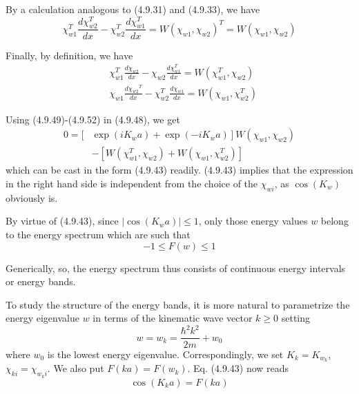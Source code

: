 \documentclass{article}
\begin{document}
By a calculation analogous to (4.9.31) and (4.9.33), we have
$$
\begin{equation*}
\chi_{w 1}^{T} \frac{d \chi_{w 2}^{T}}{d x}-\chi_{w 2}^{T} \frac{d \chi_{w 1}^{T}}{d x}=W\left(\chi_{w 1}, \chi_{w 2}\right)^{T}=W\left(\chi_{w 1}, \chi_{w 2}\right) \tag{4.9.50}
\end{equation*}
$$

Finally, by definition, we have
$$
\begin{align*}
& \chi_{w 1}^{T} \frac{d \chi_{w 2}}{d x}-\chi_{w 2} \frac{d \chi_{w 1}^{T}}{d x}=W\left(\chi_{w 1}^{T}, \chi_{w 2}\right)  \tag{4.9.51}\\
& \chi_{w 1} \frac{d \chi_{w 2}{ }^{T}}{d x}-\chi_{w 2}^{T} \frac{d \chi_{w 1}}{d x}=W\left(\chi_{w 1}, \chi_{w 2}^{T}\right) \tag{4.9.52}
\end{align*}
$$

Using (4.9.49)-(4.9.52) in (4.9.48), we get
$$
\begin{align*}
0=[ & \left.\exp \left(i K_{w} a\right)+\exp \left(-i K_{w} a\right)\right] W\left(\chi_{w 1}, \chi_{w 2}\right)  \tag{4.9.53}\\
& -\left[W\left(\chi_{w 1}^{T}, \chi_{w 2}\right)+W\left(\chi_{w 1}, \chi_{w 2}^{T}\right)\right]
\end{align*}
$$
which can be cast in the form (4.9.43) readily. (4.9.43) implies that the expression in the right hand side is independent from the choice of the $\chi_{w i}$, as $\cos \left(K_{w}\right)$ obviously is.

By virtue of (4.9.43), since $\left|\cos \left(K_{w} a\right)\right| \leq 1$, only those energy values $w$ belong to the energy spectrum which are such that
$$
\begin{equation*}
-1 \leq F(w) \leq 1 \tag{4.9.54}
\end{equation*}
$$

Generically, so, the energy spectrum thus consists of continuous energy intervals or energy bands.

To study the structure of the energy bands, it is more natural to parametrize the energy eigenvalue $w$ in terms of the kinematic wave vector $k \geq 0$ setting
$$
\begin{equation*}
w=w_{k}=\frac{\hbar^{2} k^{2}}{2 m}+w_{0} \tag{4.9.55}
\end{equation*}
$$
where $w_{0}$ is the lowest energy eigenvalue. Correspondingly, we set $K_{k}=K_{w_{k}}$, $\chi_{k i}=\chi_{w_{k} i}$. We also put $F(k a)=F\left(w_{k}\right)$. Eq. (4.9.43) now reads
$$
\begin{equation*}
\cos \left(K_{k} a\right)=F(k a) \tag{4.9.56}
\end{equation*}
$$
\end{document}
